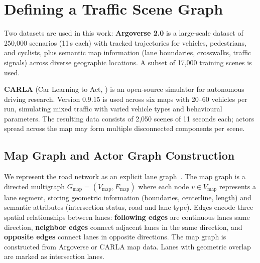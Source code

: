 \section{Defining a Traffic Scene Graph}
\label{chapter:defining_a_traffic_scene_graph}

Two datasets are used in this work: \textbf{Argoverse 2.0} \cite{Argoverse2} is a large-scale dataset of 250,000 scenarios (11\,s each) with tracked trajectories for vehicles, pedestrians, and cyclists, plus semantic map information (lane boundaries, crosswalks, traffic signals) across diverse geographic locations. A subset of 17,000 training scenes is used.

\textbf{CARLA} (Car Learning to Act, \cite{Dosovitskiy17Carla}) is an open-source simulator for autonomous driving research. Version $0.9.15$ is used across six maps with 20–60 vehicles per run, simulating mixed traffic with varied vehicle types and behavioural parameters. The resulting data consists of 2,050 scenes of 11 seconds each; actors spread across the map may form multiple disconnected components per scene.

\subsection{Map Graph and Actor Graph Construction}
\label{subsec:map_graph}

We represent the road network as an explicit lane graph~\cite{liang2020lanegcn}. The map graph is a directed multigraph $G_{\text{map}} = (V_{\text{map}}, E_{\text{map}})$ where each node $v \in V_{\text{map}}$ represents a lane segment, storing geometric information (boundaries, centerline, length) and semantic attributes (intersection status, road and lane type). Edges encode three spatial relationships between lanes:
\textbf{following edges} are continuous lanes same direction,
\textbf{neighbor edges} connect adjacent lanes in the same direction, and
\textbf{opposite edges} connect lanes in opposite directions.
The map graph is constructed from Argoverse or CARLA map data. Lanes with geometric overlap are marked as intersection lanes.

